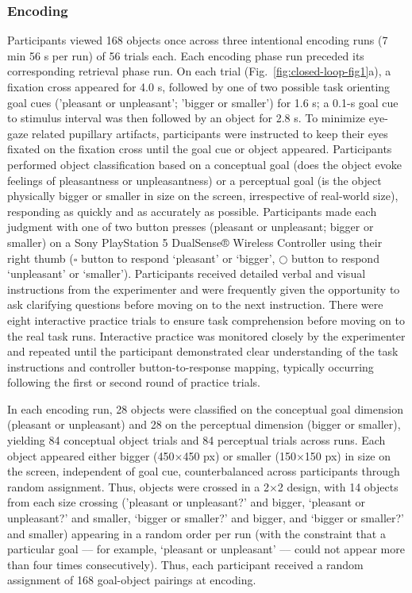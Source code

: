 \subsubsection{Encoding}

Participants viewed 168 objects once across three intentional encoding runs (7 min 56 s per run) of 56 trials each. Each encoding phase run preceded its corresponding retrieval phase run. On each trial (Fig.~\ref{fig:closed-loop-fig1}a), a fixation cross appeared for 4.0 s, followed by one of two possible task orienting goal cues ('pleasant or unpleasant'; 'bigger or smaller') for 1.6 s; a 0.1-s goal cue to stimulus interval was then followed by an object for 2.8 s. To minimize eye-gaze related pupillary artifacts, participants were instructed to keep their eyes fixated on the fixation cross until the goal cue or object appeared. Participants performed object classification based on a conceptual goal (does the object evoke feelings of pleasantness or unpleasantness) or a perceptual goal (is the object physically bigger or smaller in size on the screen, irrespective of real-world size), responding as quickly and as accurately as possible. Participants made each judgment with one of two button presses (pleasant or unpleasant; bigger or smaller) on a Sony PlayStation 5 DualSense® Wireless Controller using their right thumb ($\square$ button to respond `pleasant' or `bigger', $\bigcirc$ button to respond `unpleasant' or `smaller'). Participants received detailed verbal and visual instructions from the experimenter and were frequently given the opportunity to ask clarifying questions before moving on to the next instruction. There were eight interactive practice trials to ensure task comprehension before moving on to the real task runs. Interactive practice was monitored closely by the experimenter and repeated until the participant demonstrated clear understanding of the task instructions and controller button-to-response mapping, typically occurring following the first or second round of practice trials.

In each encoding run, 28 objects were classified on the conceptual goal dimension (pleasant or unpleasant) and 28 on the perceptual dimension (bigger or smaller), yielding 84 conceptual object trials and 84 perceptual trials across runs. Each object appeared either bigger (450$\times$450 px) or smaller (150$\times$150 px) in size on the screen, independent of goal cue, counterbalanced across participants through random assignment. Thus, objects were crossed in a 2$\times$2 design, with 14 objects from each size crossing ('pleasant or unpleasant?' and bigger, `pleasant or unpleasant?' and smaller, `bigger or smaller?' and bigger, and `bigger or smaller?' and smaller) appearing in a random order per run (with the constraint that a particular goal –– for example, `pleasant or unpleasant' –– could not appear more than four times consecutively). Thus, each participant received a random assignment of 168 goal-object pairings at encoding.


